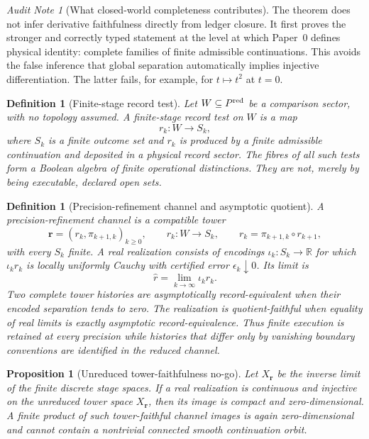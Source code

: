 \documentclass[11pt]{article}
\newtheorem{proposition}[theorem]{Proposition}
\newtheorem{definition}[theorem]{Definition}
\theoremstyle{remark}
\newtheorem{audit}[theorem]{Audit Note}
\begin{document}
\begin{audit}[What closed-world completeness contributes]
The theorem does not infer derivative faithfulness directly from ledger
closure.  It first proves the stronger and correctly typed statement at the
level at which Paper~0 defines physical identity: complete families of finite
admissible continuations.  This avoids the false inference that global
separation automatically implies injective differentiation.  The latter fails,
for example, for $t\mapsto t^2$ at $t=0$.
\end{audit}



\begin{definition}[Finite-stage record test]
\label{def:finite-stage-record-test}
Let $W\subseteq P^{\rm red}$ be a comparison sector, with no topology assumed.
A \emph{finite-stage record test} on $W$ is a map
\[
        r_k:W\longrightarrow S_k,
\]
where $S_k$ is a finite outcome set and $r_k$ is produced by a finite
admissible continuation and deposited in a physical record sector.  The fibres
of all such tests form a Boolean algebra of finite operational distinctions.
They are not, merely by being executable, declared open sets.
\end{definition}

\begin{definition}[Precision-refinement channel and asymptotic quotient]
\label{def:precision-refinement-channel}
A \emph{precision-refinement channel} is a compatible tower
\[
\mathbf r=(r_k,\pi_{k+1,k})_{k\ge0},\qquad
r_k:W\to S_k,\qquad
r_k=\pi_{k+1,k}\circ r_{k+1},
\]
with every \(S_k\) finite. A real realization consists of encodings
\(\iota_k:S_k\to\mathbb R\) for which \(\iota_k r_k\) is locally uniformly
Cauchy with certified error \(\epsilon_k\downarrow0\). Its limit is
\[
\widehat r=\lim_{k\to\infty}\iota_k r_k.
\]
Two complete tower histories are \emph{asymptotically record-equivalent} when
their encoded separation tends to zero. The realization is
\emph{quotient-faithful} when equality of real limits is exactly asymptotic
record-equivalence. Thus finite execution is retained at every precision while
histories that differ only by vanishing boundary conventions are identified in
the reduced channel.
\end{definition}

\begin{proposition}[Unreduced tower-faithfulness no-go]
\label{prop:tower-faithful-no-go}
Let \(X_{\mathbf r}\) be the inverse limit of the finite discrete stage spaces.
If a real realization is continuous and injective on the unreduced tower space
\(X_{\mathbf r}\), then its image is compact and zero-dimensional. A finite
product of such tower-faithful channel images is again zero-dimensional and
cannot contain a nontrivial connected smooth continuation orbit.
\end{proposition}
\end{document}
